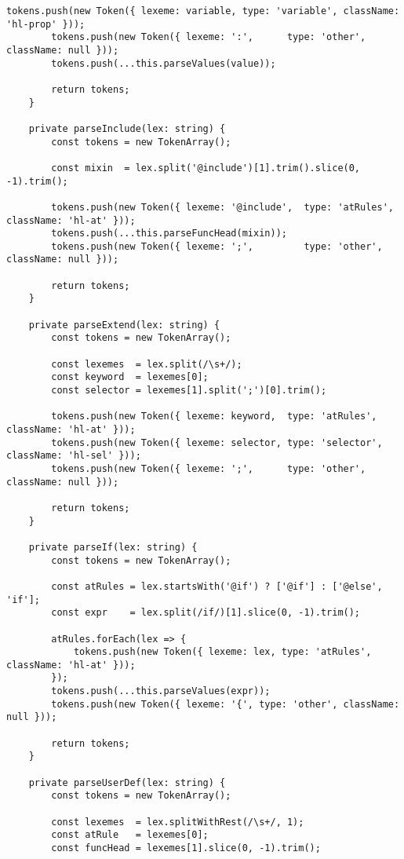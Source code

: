 \documentclass[autodetect-engine,dvi=dvipdfmx,ja=standard,
               a4j,11pt]{bxjsarticle}
\begin{document}
\begin{lstlisting}[caption={CSS/SCSSハイライタ({\tt scss.ts})(1)}, label={prog:scss1}]
        tokens.push(new Token({ lexeme: variable, type: 'variable', className: 'hl-prop' }));
        tokens.push(new Token({ lexeme: ':',      type: 'other',    className: null }));
        tokens.push(...this.parseValues(value));
        
        return tokens;
    }

    private parseInclude(lex: string) {
        const tokens = new TokenArray();

        const mixin  = lex.split('@include')[1].trim().slice(0, -1).trim();
    
        tokens.push(new Token({ lexeme: '@include',  type: 'atRules',  className: 'hl-at' }));
        tokens.push(...this.parseFuncHead(mixin));
        tokens.push(new Token({ lexeme: ';',         type: 'other',    className: null }));

        return tokens;
    }

    private parseExtend(lex: string) {
        const tokens = new TokenArray();

        const lexemes  = lex.split(/\s+/);
        const keyword  = lexemes[0];
        const selector = lexemes[1].split(';')[0].trim();
        
        tokens.push(new Token({ lexeme: keyword,  type: 'atRules',  className: 'hl-at' }));
        tokens.push(new Token({ lexeme: selector, type: 'selector', className: 'hl-sel' }));
        tokens.push(new Token({ lexeme: ';',      type: 'other',    className: null }));

        return tokens;
    }

    private parseIf(lex: string) {
        const tokens = new TokenArray();

        const atRules = lex.startsWith('@if') ? ['@if'] : ['@else', 'if'];
        const expr    = lex.split(/if/)[1].slice(0, -1).trim();
        
        atRules.forEach(lex => {
            tokens.push(new Token({ lexeme: lex, type: 'atRules', className: 'hl-at' }));
        });
        tokens.push(...this.parseValues(expr));
        tokens.push(new Token({ lexeme: '{', type: 'other', className: null }));  

        return tokens;        
    }

    private parseUserDef(lex: string) {
        const tokens = new TokenArray();

        const lexemes  = lex.splitWithRest(/\s+/, 1);
        const atRule   = lexemes[0];
        const funcHead = lexemes[1].slice(0, -1).trim();


\end{lstlisting}
\end{document}
